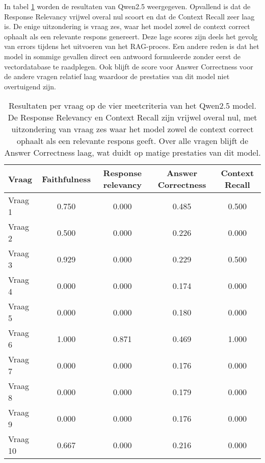 In tabel \ref{tab:resultaten_vragen_qwen2.5} worden de resultaten van Qwen2.5 weergegeven. Opvallend is dat de Response Relevancy vrijwel overal nul scoort en dat de Context Recall zeer laag is. De enige uitzondering is vraag zes, waar het model zowel de context correct ophaalt als een relevante respons genereert. Deze lage scores zijn deels het gevolg van errors tijdens het uitvoeren van het RAG-proces. Een andere reden is dat het model in sommige gevallen direct een antwoord formuleerde zonder eerst de vectordatabase te raadplegen. Ook blijft de score voor Answer Correctness voor de andere vragen relatief laag waardoor de prestaties van dit model niet overtuigend zijn.

\begin{table}[H]
    \begin{tabular}{|l|c|c|c|c|}
        \hline
        \textbf{Vraag} & \textbf{Faithfulness} & \textbf{Response relevancy} & \textbf{Answer Correctness} & \textbf{Context Recall} \\
        \hline
        Vraag 1  & 0.750 & 0.000 & 0.485 & 0.500 \\
        Vraag 2  & 0.500 & 0.000 & 0.226 & 0.000 \\
        Vraag 3  & 0.929 & 0.000 & 0.229 & 0.500 \\
        Vraag 4  & 0.000 & 0.000 & 0.174 & 0.000 \\
        Vraag 5  & 0.000 & 0.000 & 0.180 & 0.000 \\
        Vraag 6  & 1.000 & 0.871 & 0.469 & 1.000 \\
        Vraag 7  & 0.000 & 0.000 & 0.176 & 0.000 \\
        Vraag 8  & 0.000 & 0.000 & 0.179 & 0.000 \\
        Vraag 9  & 0.000 & 0.000 & 0.176 & 0.000 \\
        Vraag 10 & 0.667 & 0.000 & 0.216 & 0.000 \\
        \hline
    \end{tabular}
    \caption{Resultaten per vraag op de vier meetcriteria van het Qwen2.5 model. De Response Relevancy en Context Recall zijn vrijwel overal nul, met uitzondering van vraag zes waar het model zowel de context correct ophaalt als een relevante respons geeft. Over alle vragen blijft de Answer Correctness laag, wat duidt op matige prestaties van dit model.}
    \label{tab:resultaten_vragen_qwen2.5}
\end{table}


